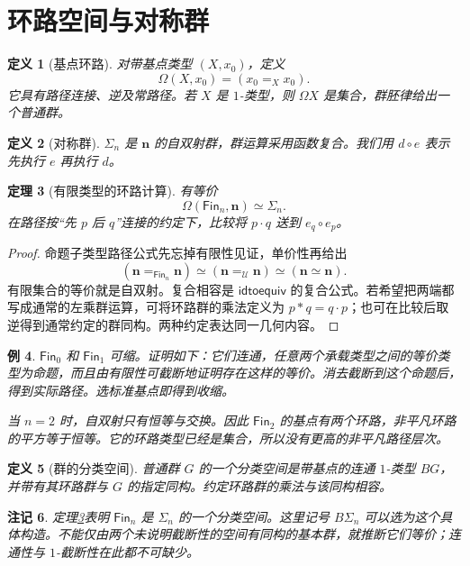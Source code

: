 \documentclass[12pt,oneside,openany,fontset=none]{ctexbook}
\theoremstyle{cn}
\newtheorem{definition}{定义}[chapter]
\newtheorem{example}[definition]{例}
\newtheorem{theorem}[definition]{定理}
\newtheorem{remark}[definition]{注记}
\numberwithin{equation}{chapter}
\newcommand{\U}{\mathcal U}
\newcommand{\idtoequiv}{\mathsf{idtoequiv}}
\newcommand{\Fin}{\mathsf{Fin}}
\begin{document}
\section{环路空间与对称群}
\begin{definition}[基点环路]
对带基点类型 $(X,x_0)$，定义
\[
\Omega(X,x_0)=(x_0=_Xx_0).
\]
它具有路径连接、逆及常路径。若 $X$ 是 $1$-类型，则 $\Omega X$ 是集合，群胚律给出一个普通群。
\end{definition}
\begin{definition}[对称群]
$\Sigma_n$ 是 $\mathbf n$ 的自双射群，群运算采用函数复合。我们用 $d\circ e$ 表示先执行 $e$ 再执行 $d$。
\end{definition}
\begin{theorem}[有限类型的环路计算]\label{thm:finite-loops}
有等价
\[
\Omega(\Fin_n,\mathbf n)\simeq\Sigma_n.
\]
在路径按“先 $p$ 后 $q$”连接的约定下，比较将 $p\cdot q$ 送到 $e_q\circ e_p$。
\end{theorem}
\begin{proof}
命题子类型路径公式先忘掉有限性见证，单价性再给出
\[
(\mathbf n=_{\Fin_n}\mathbf n)
\simeq(\mathbf n=_{\U}\mathbf n)
\simeq(\mathbf n\simeq\mathbf n).
\]
有限集合的等价就是自双射。复合相容是 $\idtoequiv$ 的复合公式。若希望把两端都写成通常的左乘群运算，可将环路群的乘法定义为 $p*q=q\cdot p$；也可在比较后取逆得到通常约定的群同构。两种约定表达同一几何内容。
\end{proof}
\begin{example}
$\Fin_0$ 和 $\Fin_1$ 可缩。证明如下：它们连通，任意两个承载类型之间的等价类型为命题，而且由有限性可截断地证明存在这样的等价。消去截断到这个命题后，得到实际路径。选标准基点即得到收缩。

当 $n=2$ 时，自双射只有恒等与交换。因此 $\Fin_2$ 的基点有两个环路，非平凡环路的平方等于恒等。它的环路类型已经是集合，所以没有更高的非平凡路径层次。
\end{example}
\begin{definition}[群的分类空间]
普通群 $G$ 的一个分类空间是带基点的连通 $1$-类型 $BG$，并带有其环路群与 $G$ 的指定同构。约定环路群的乘法与该同构相容。
\end{definition}
\begin{remark}
定理\ref{thm:finite-loops}表明 $\Fin_n$ 是 $\Sigma_n$ 的一个分类空间。这里记号 $B\Sigma_n$ 可以选为这个具体构造。不能仅由两个未说明截断性的空间有同构的基本群，就推断它们等价；连通性与 $1$-截断性在此都不可缺少。
\end{remark}
\end{document}
